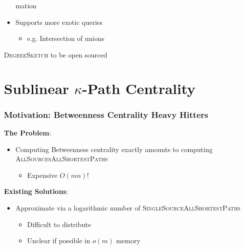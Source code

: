 \documentclass{beamer}
\newcommand{\algoname}[1]{\textnormal{\textsc{#1}}}
\begin{document}
\begin{frame}
\begin{itemize}
mation
	\item Supports more exotic queries
	\begin{itemize}
		\item e.g. Intersection of unions
	\end{itemize}
\end{itemize}

\begin{block}{}
	\begin{center}
		\algoname{DegreeSketch} to be open sourced	
	\end{center}
\end{block}

\end{frame}


\section{Sublinear $\kappa$-Path Centrality}


\begin{frame}
\frametitle{Motivation: Betweenness Centrality Heavy Hitters}

\textbf{The Problem}:
\begin{itemize}
	\item Computing Betweenness centrality exactly amounts to computing \algoname{AllSourcesAllShortestPaths}
	\begin{itemize}
		\item Expensive $O(mn)$!
	\end{itemize}
\end{itemize}
\textbf{Existing Solutions}:
\begin{itemize}
	\item Approximate via a logarithmic number of \algoname{SingleSourceAllShortestPaths} \cite{green2012fast, bergamini2014approximating, yoshida2014almost, kourtellis2015scalable, riondato2016fast}
	\begin{itemize}
		\item Difficult to distribute
		\item Unclear if possible in $o(m)$ memory
	\end{itemize}
\end{itemize}


\end{frame}
\end{document}

